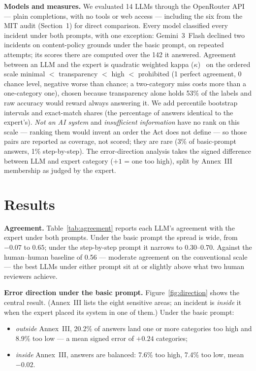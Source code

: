 \documentclass[sigconf,natbib=false, language=english]{acmart}
\begin{document}
\textbf{Models and measures.} We evaluated 14 LLMs through the OpenRouter API --- plain
completions, with no tools or web access --- including the six from the MIT audit
(Section~1) for direct comparison. Every model classified every incident under both
prompts, with one exception: Gemini~3~Flash declined two incidents on content-policy
grounds under the basic prompt, on repeated attempts; its scores there are computed
over the 142 it answered. Agreement between an LLM and the expert is quadratic weighted kappa
($\kappa$)~\cite{cohen1968} on the ordered scale minimal $<$ transparency $<$ high $<$
prohibited (1 perfect agreement, 0 chance level, negative worse than chance; a
two-category miss costs more than a one-category one), chosen because transparency
alone holds 53\% of the labels and raw accuracy would reward always answering it. We
add percentile bootstrap intervals and exact-match shares (the percentage of answers
identical to the expert's). \emph{Not an AI system} and \emph{insufficient
information} have no rank on this scale --- ranking them would invent an order the
Act does not define --- so those pairs are reported as coverage, not scored; they are
rare (3\% of basic-prompt answers, 1\% step-by-step). The error-direction
analysis takes the signed difference between LLM and expert
category ($+1$ = one too high), split by Annex~III membership as judged by the
expert.

\section{Results}

\textbf{Agreement.} Table~\ref{tab:agreement} reports each LLM's agreement with the
expert under both prompts. Under the basic prompt the spread is wide, from $-0.07$ to
$0.65$; under the step-by-step prompt it narrows to $0.30$--$0.70$. Against the
human--human baseline of 0.56 --- moderate agreement on the conventional
scale~\cite{landis1977} --- the best LLMs under either prompt sit at or slightly above
what two human reviewers achieve.

\textbf{Error direction under the basic prompt.} Figure~\ref{fig:direction} shows the
central result. (Annex~III lists the eight sensitive areas; an incident is
\emph{inside} it when the expert placed its system in one of them.) Under the basic
prompt:
\begin{itemize}
\item \emph{outside} Annex~III, 20.2\% of answers land one or more categories too high
  and 8.9\% too low --- a mean signed error of $+0.24$ categories;
\item \emph{inside} Annex~III, answers are balanced: 7.6\% too high, 7.4\% too low,
  mean $-0.02$.
\end{itemize}
\end{document}
